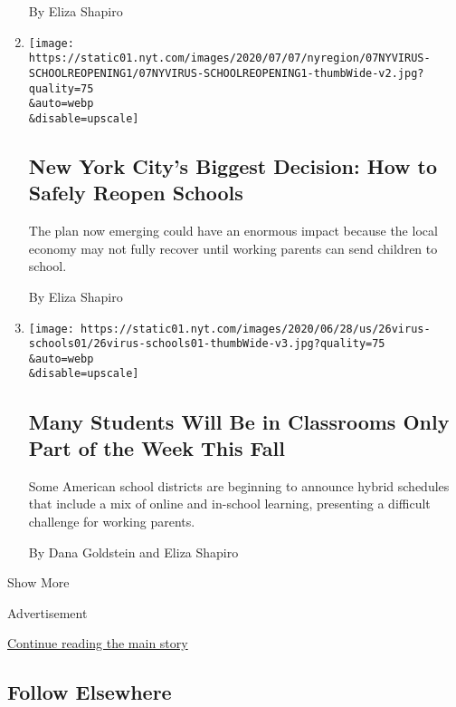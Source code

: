 \begin{enumerate}
  By Eliza Shapiro
\item
  \href{/2020/07/06/nyregion/nyc-school-reopening-plan.html}{}

  \texttt{[image: https://static01.nyt.com/images/2020/07/07/nyregion/07NYVIRUS-SCHOOLREOPENING1/07NYVIRUS-SCHOOLREOPENING1-thumbWide-v2.jpg?quality=75\\\&auto=webp\\\&disable=upscale]}

  \hypertarget{new-york-citys-biggest-decision-how-to-safely-reopen-schools}{%
  \subsection{New York City's Biggest Decision: How to Safely Reopen
  Schools}\label{new-york-citys-biggest-decision-how-to-safely-reopen-schools}}

  The plan now emerging could have an enormous impact because the local
  economy may not fully recover until working parents can send children
  to school.

  By Eliza Shapiro
\item
  \href{/2020/06/26/us/coronavirus-schools-reopen-fall.html}{}

  \texttt{[image: https://static01.nyt.com/images/2020/06/28/us/26virus-schools01/26virus-schools01-thumbWide-v3.jpg?quality=75\\\&auto=webp\\\&disable=upscale]}

  \hypertarget{many-students-will-be-in-classrooms-only-part-of-the-week-this-fall}{%
  \subsection{Many Students Will Be in Classrooms Only Part of the Week
  This
  Fall}\label{many-students-will-be-in-classrooms-only-part-of-the-week-this-fall}}

  Some American school districts are beginning to announce hybrid
  schedules that include a mix of online and in-school learning,
  presenting a difficult challenge for working parents.

  By Dana Goldstein and Eliza Shapiro
\end{enumerate}

Show More

Advertisement

\protect\hyperlink{after-mid2}{Continue reading the main story}

\hypertarget{follow-elsewhere}{%
\subsection{Follow Elsewhere}\label{follow-elsewhere}}

